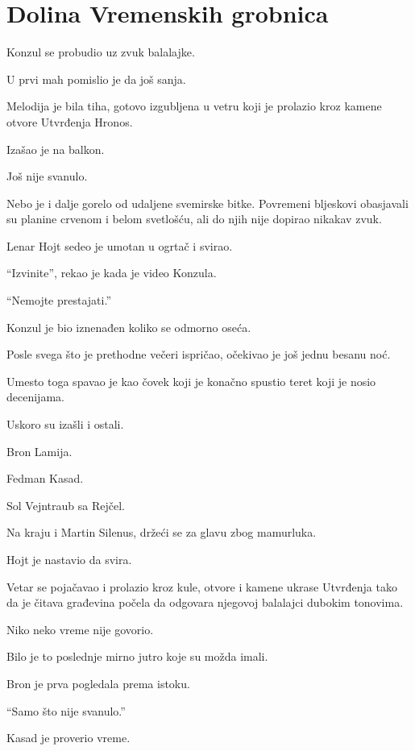 \chapter{Dolina Vremenskih grobnica}


Konzul se probudio uz zvuk balalajke.

U prvi mah pomislio je da još sanja.

Melodija je bila tiha, gotovo izgubljena u vetru koji je prolazio kroz kamene otvore Utvrđenja Hronos.

Izašao je na balkon.

Još nije svanulo.

Nebo je i dalje gorelo od udaljene svemirske bitke. Povremeni bljeskovi obasjavali su planine crvenom i belom svetlošću, ali do njih nije dopirao nikakav zvuk.

Lenar Hojt sedeo je umotan u ogrtač i svirao.

``Izvinite'', rekao je kada je video Konzula.

``Nemojte prestajati.''

Konzul je bio iznenađen koliko se odmorno oseća.

Posle svega što je prethodne večeri ispričao, očekivao je još jednu besanu noć.

Umesto toga spavao je kao čovek koji je konačno spustio teret koji je nosio decenijama.

Uskoro su izašli i ostali.

Bron Lamija.

Fedman Kasad.

Sol Vejntraub sa Rejčel.

Na kraju i Martin Silenus, držeći se za glavu zbog mamurluka.

Hojt je nastavio da svira.

Vetar se pojačavao i prolazio kroz kule, otvore i kamene ukrase Utvrđenja tako da je čitava građevina počela da odgovara njegovoj balalajci dubokim tonovima.

Niko neko vreme nije govorio.

Bilo je to poslednje mirno jutro koje su možda imali.

Bron je prva pogledala prema istoku.

``Samo što nije svanulo.''

Kasad je proverio vreme.


